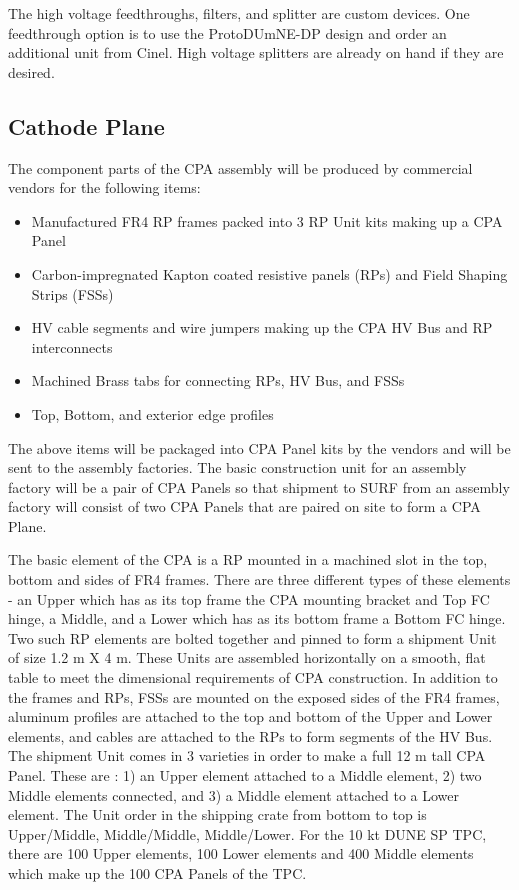 The high voltage feedthroughs, filters, and splitter are custom devices.  One feedthrough option is to use the ProtoDUmNE-DP design and order an additional unit from Cinel.  High voltage splitters are already on hand if they are desired.

\subsection{Cathode Plane}
\label{sec:fddp-hv-supplies}

The component parts of the CPA assembly will be produced by commercial vendors for the following items:
\begin{itemize}
\item Manufactured FR4 RP frames packed into 3 RP Unit kits making up a CPA Panel
\item Carbon-impregnated Kapton coated resistive panels (RPs) and Field Shaping Strips (FSSs)
\item HV cable segments and wire jumpers making up the CPA HV Bus and RP interconnects
\item Machined Brass tabs for connecting RPs, HV Bus, and FSSs
\item Top, Bottom, and exterior edge profiles
\end{itemize}
The above items will be packaged into CPA Panel kits by the vendors and will be sent to the assembly factories.  The basic construction unit for an assembly factory will be a pair of CPA Panels so that shipment to SURF from an assembly factory will consist of two CPA Panels that are paired on site to form a CPA Plane.

The basic element of the CPA is a RP mounted in a machined slot in the top, bottom and sides of FR4 frames.  There are three different types of these elements - an Upper which has as its top frame the CPA mounting bracket and Top FC hinge, a Middle, and a Lower which has as its bottom frame a Bottom FC hinge.  Two such RP elements are bolted together and pinned to form a shipment Unit of size 1.2 m X 4 m.  These Units are assembled horizontally on a smooth, flat table to meet the dimensional requirements of CPA construction.  In addition to the frames and RPs, FSSs are mounted on the exposed sides of the FR4 frames, aluminum profiles are attached to the top and bottom of the Upper and Lower elements, and cables are attached to the RPs to form segments of the HV Bus.  The shipment Unit comes in 3 varieties in order to make a full 12 m tall CPA Panel.  These are : 1) an Upper element attached to a Middle element, 2) two Middle elements connected, and 3) a Middle element attached to a Lower element.  The Unit order in the shipping crate from bottom to top is Upper/Middle, Middle/Middle, Middle/Lower.  For the 10 kt DUNE SP TPC, there are 100 Upper elements, 100 Lower elements and 400 Middle elements which make up the 100 CPA Panels of the TPC.

